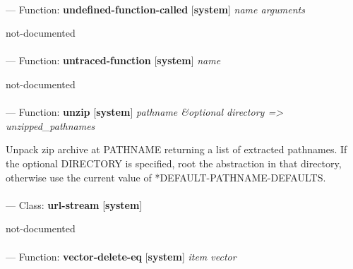 \paragraph{}
\label{SYSTEM:UNDEFINED-FUNCTION-CALLED}
--- Function: \textbf{undefined-function-called} [\textbf{system}] \textit{name arguments}

\begin{adjustwidth}{5em}{5em}
not-documented
\end{adjustwidth}

\paragraph{}
\label{SYSTEM:UNTRACED-FUNCTION}
--- Function: \textbf{untraced-function} [\textbf{system}] \textit{name}

\begin{adjustwidth}{5em}{5em}
not-documented
\end{adjustwidth}

\paragraph{}
\label{SYSTEM:UNZIP}
--- Function: \textbf{unzip} [\textbf{system}] \textit{pathname \&optional directory => unzipped\_pathnames}

\begin{adjustwidth}{5em}{5em}
Unpack zip archive at PATHNAME returning a list of extracted pathnames.
If the optional DIRECTORY is specified, root the abstraction in that directory, otherwise use the current value of *DEFAULT-PATHNAME-DEFAULTS.
\end{adjustwidth}

\paragraph{}
\label{SYSTEM:URL-STREAM}
--- Class: \textbf{url-stream} [\textbf{system}] \textit{}

\begin{adjustwidth}{5em}{5em}
not-documented
\end{adjustwidth}

\paragraph{}
\label{SYSTEM:VECTOR-DELETE-EQ}
--- Function: \textbf{vector-delete-eq} [\textbf{system}] \textit{item vector}

